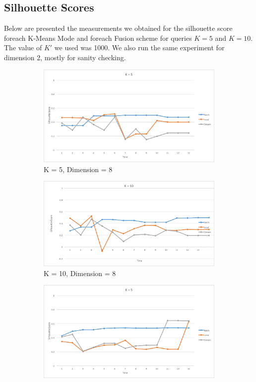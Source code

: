 \documentclass{lmproj}
\begin{document}
\subsection{Silhouette Scores}

Below are presented the measurements we obtained for the silhouette score foreach K-Means Mode and foreach Fusion scheme for queries $K  = 5$ and $K = 10$. The value of $K'$ we used was 1000. We also run the same experiment for dimension 2, mostly for sanity checking.

\begin{figure}[H]
	\begin{subfigure}{.5\textwidth}
		\centering
		\includegraphics[width=.8\linewidth]{silhouette/silhouette_50_50_k_5_dim_8}
		\caption*{K = 5, Dimension = 8}
		\label{fig:silhouette_50_50_k_5_dim_8}
	\end{subfigure}%
	\begin{subfigure}{.5\textwidth}
		\centering
		\includegraphics[width=.8\linewidth]{silhouette/silhouette_50_50_k_10_dim_8}
		\caption*{K = 10, Dimension = 8}
		\label{fig:silhouette_50_50_k_10_dim_8}
	\end{subfigure}
	\begin{subfigure}{.5\textwidth}
		\centering
		\includegraphics[width=.8\linewidth]{silhouette/silhouette_50_50_k_5_dim_2}

\end{subfigure}
\end{figure}
\end{document}
